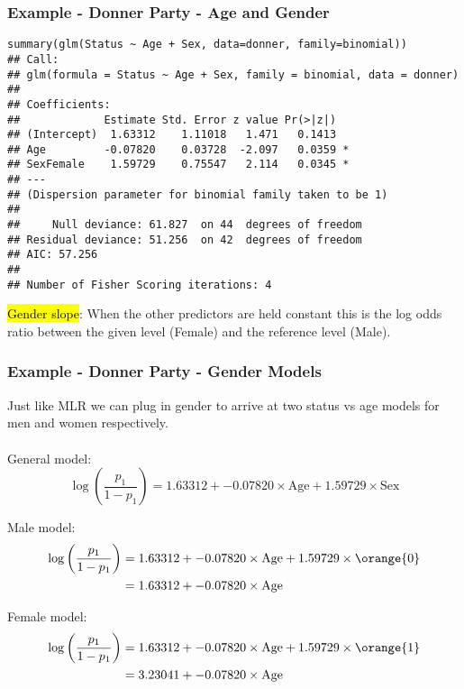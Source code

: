 
\begin{frame}[fragile]
\frametitle{Example - Donner Party - Age and Gender}
\vspace{-3mm}
{\tiny
\begin{verbatim}
summary(glm(Status ~ Age + Sex, data=donner, family=binomial))
## Call:
## glm(formula = Status ~ Age + Sex, family = binomial, data = donner)
## 
## Coefficients:
##             Estimate Std. Error z value Pr(>|z|)  
## (Intercept)  1.63312    1.11018   1.471   0.1413  
## Age         -0.07820    0.03728  -2.097   0.0359 *
## SexFemale    1.59729    0.75547   2.114   0.0345 *
## ---
## (Dispersion parameter for binomial family taken to be 1)
## 
##     Null deviance: 61.827  on 44  degrees of freedom
## Residual deviance: 51.256  on 42  degrees of freedom
## AIC: 57.256
## 
## Number of Fisher Scoring iterations: 4
\end{verbatim}
}
\vspace{-1em}
\hl{Gender slope}: When the other predictors are held constant this is the log odds ratio between the given level (Female) and the reference level (Male).

\end{frame}


\begin{frame}
\frametitle{Example - Donner Party - Gender Models}

Just like MLR we can plug in gender to arrive at two status vs age models for men and women respectively.\\
~\\

General model:
{\scriptsize
\[\log\left(\frac{p_1}{1-p_1}\right) = 1.63312 + -0.07820\times\text{Age} + 1.59729\times\text{Sex}\]
}

Male model:
{\scriptsize
\begin{align*}
\log\left(\frac{p_1}{1-p_1}\right) &= 1.63312 + -0.07820\times\text{Age} + 1.59729\times\orange{0}\\
                                   &= 1.63312 + -0.07820\times\text{Age}
\end{align*}
}

Female model:
{\scriptsize
\begin{align*}
\log\left(\frac{p_1}{1-p_1}\right) &= 1.63312 + -0.07820\times\text{Age} + 1.59729\times\orange{1}\\
                                   &= 3.23041 + -0.07820\times\text{Age}
\end{align*}
}

\end{frame}

